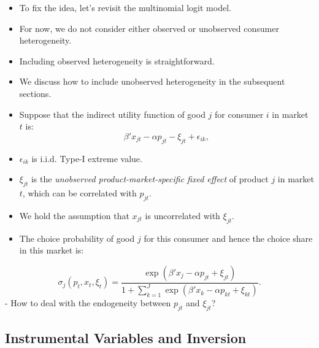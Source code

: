\documentclass[
]{book}
\providecommand{\tightlist}{%
  \setlength{\itemsep}{0pt}\setlength{\parskip}{0pt}}
\begin{document}
\begin{itemize}
\tightlist
\item
  To fix the idea, let's revisit the multinomial logit model.
\item
  For now, we do not consider either observed or unobserved consumer heterogeneity.
\item
  Including observed heterogeneity is straightforward.
\item
  We discuss how to include unobserved heterogeneity in the subsequent sections.
\item
  Suppose that the indirect utility function of good \(j\) for consumer \(i\) in market \(t\) is:
  \begin{equation}
  \beta' x_{jt}  - \alpha p_{jt} - \xi_{jt} + \epsilon_{ik},
  \end{equation}
\item
  \(\epsilon_{ik}\) is i.i.d. Type-I extreme value.
\item
  \(\xi_{jt}\) is the \emph{unobserved product-market-specific fixed effect} of product \(j\) in market \(t\), which can be correlated with \(p_{jt}\).
\item
  We hold the assumption that \(x_{jt}\) is uncorrelated with \(\xi_{jt}\).
\item
  The choice probability of good \(j\) for this consumer and hence the choice share in this market is:
\end{itemize}

\begin{equation}
\sigma_j(p_t, x_t, \xi_t) = \frac{\exp(\beta' x_j - \alpha p_{jt} + \xi_{jt})}{1 + \sum_{k = 1}^J\exp(\beta' x_k - \alpha p_{kt} +  \xi_{kt} ) }.
\end{equation}
- How to deal with the endogeneity between \(p_{jt}\) and \(\xi_{jt}\)?

\hypertarget{instrumental-variables-and-inversion}{%
\subsection{Instrumental Variables and Inversion}\label{instrumental-variables-and-inversion}}
\end{document}
